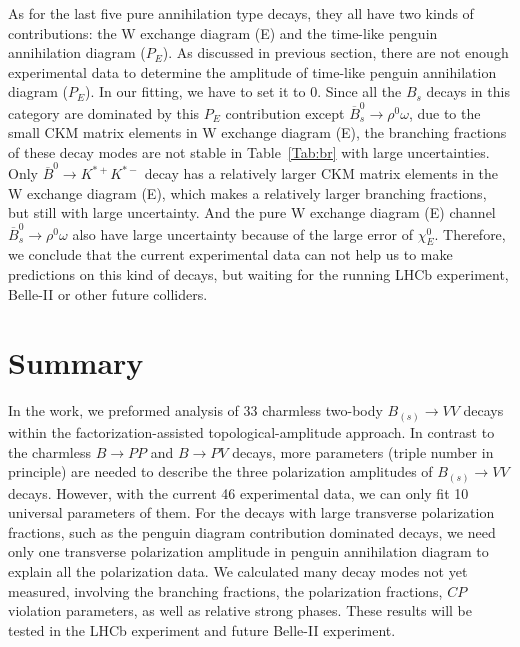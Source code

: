 \documentclass[11pt]{article}
\begin{document}
As for the last five pure annihilation type decays, they all have two kinds of contributions: the W exchange diagram (E) and the time-like penguin annihilation diagram ($P_E$). As discussed in previous section, there are not enough experimental data  to determine the amplitude of time-like penguin annihilation diagram ($P_E$). In our fitting, we have to set it to 0. Since all the $B_s$ decays in this category are dominated by this $P_E$ contribution except $\overline B_s^0 \to \rho^0\omega$, due to the small CKM matrix elements in W exchange diagram (E), the branching fractions of these decay modes    are not stable in Table~\ref{Tab:br} with large uncertainties.   Only $\overline B^0\to K^{*+} K^{*-}$ decay has a relatively larger CKM matrix elements in the W exchange diagram (E), which makes a relatively larger branching fractions, but still with large uncertainty. And the pure W exchange diagram (E) channel $\overline B_s^0 \to \rho^0\omega$ also have large uncertainty because of the large error of $\chi_E^0$. Therefore, we conclude that    the current experimental data can not help us to make predictions on this kind of decays, but waiting for   the running LHCb experiment, Belle-II or other future colliders.

\section{Summary}\label{sec-4}

In the work, we preformed analysis of 33 charmless two-body $B_{(s)} \to VV$ decays  within the factorization-assisted topological-amplitude approach. In contrast to the charmless $B\to PP$ and $B\to PV$ decays, more parameters (triple number in principle) are needed to describe the three polarization amplitudes of $B_{(s)} \to VV$ decays. However, with the current   46 experimental data, we can only fit 10 universal  parameters of them. For the decays with large transverse polarization fractions, such as the   penguin diagram contribution dominated decays, we need only one transverse polarization amplitude in penguin annihilation diagram to explain all the polarization data.   We calculated many decay modes not yet measured, involving the branching fractions, the polarization fractions, $CP$ violation parameters, as well as    relative strong phases. These results will be tested in the LHCb experiment and future Belle-II experiment.
\end{document}
